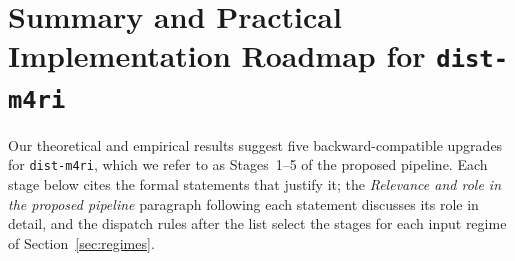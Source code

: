 \documentclass[12pt]{article}
\theoremstyle{definition}
\newcommand{\ttt}[1]{\texttt{#1}}
\begin{document}
\section{Summary and Practical Implementation Roadmap for
  \texorpdfstring{\ttt{dist-m4ri}}{dist-m4ri}}\label{sec:roadmap}

Our theoretical and empirical results suggest five backward-compatible upgrades for \ttt{dist-m4ri}, which we refer
to as Stages~1--5 of the proposed pipeline. Each stage below cites the formal statements that justify it; the
\emph{Relevance and role in the proposed pipeline} paragraph following each statement discusses its role in detail,
and the dispatch rules after the list select the stages for each input regime of Section~\ref{sec:regimes}.
\end{document}
